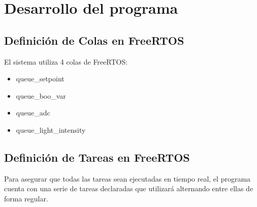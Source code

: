 \documentclass[conference]{IEEEtran}
\begin{document}
\section{Desarrollo del programa}
    \subsection{Definición de Colas en FreeRTOS}
        El sistema utiliza 4 colas de FreeRTOS:
          \begin{itemize}
            \item queue\_setpoint\par
            \item queue\_boo\_var\par
            \item queue\_adc\par
            \item queue\_light\_intensity\par
        \end{itemize}
    
    \subsection{Definición de Tareas en FreeRTOS}
        Para asegurar que todas las tareas sean ejecutadas en tiempo real, el programa cuenta con una serie de tareas declaradas que utilizará alternando entre ellas de forma regular.\par
\end{document}
